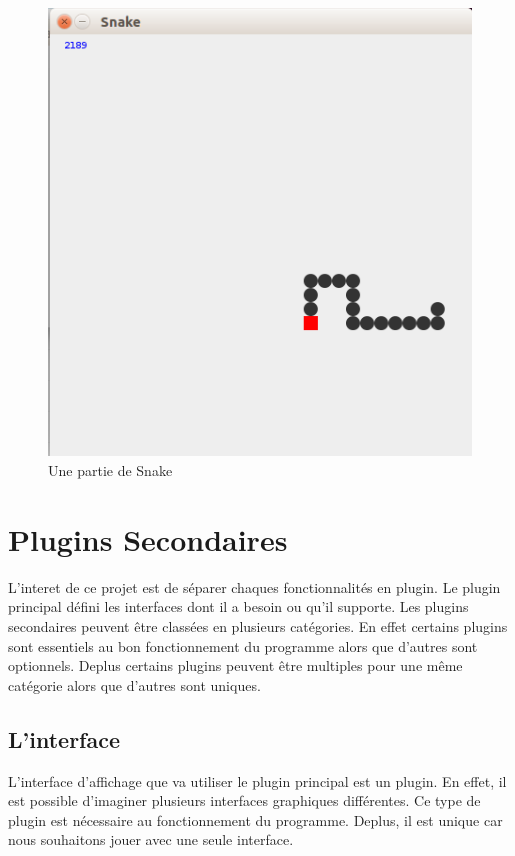 \documentclass[12pt,a4paper]{article}
\begin{document}
\begin{figure}[h]
    \centering
    \includegraphics[scale=0.4]{ressourcesSnake/snake.png}
    \caption{Une partie de Snake}
\end{figure}   
    
\section{Plugins Secondaires}    
    
    L'interet de ce projet est de séparer chaques fonctionnalités en plugin. Le plugin principal défini les interfaces dont il a besoin ou qu'il supporte. Les plugins secondaires peuvent être classées en plusieurs catégories. En effet certains plugins sont essentiels au bon fonctionnement du programme alors que d'autres sont optionnels. Deplus certains plugins peuvent être multiples pour une même catégorie alors que d'autres sont uniques. 
    
    \subsection{ L'interface}
    
    L'interface d'affichage que va utiliser le plugin principal est un plugin. En effet, il est possible d'imaginer plusieurs interfaces graphiques différentes. Ce type de plugin est nécessaire au fonctionnement du programme. Deplus, il est unique car nous souhaitons jouer avec une seule interface.
    
\end{document}
